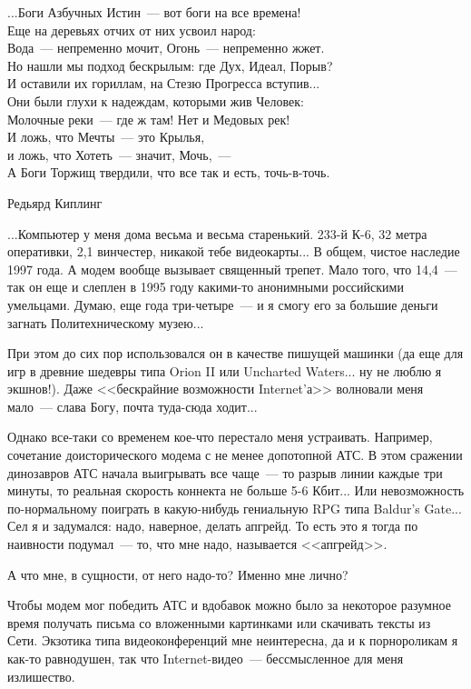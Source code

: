 \documentclass{scrbook}
\makeatletter
\newcommand{\bigepigraphwidth}{0.8} %
\newcommand{\defaultepigraphwidth}{0.5} %
\newcommand{\flqq}{<<}
\newcommand{\frqq}{>>}
\newcommand{\mdash}{~--- }
\newcommand{\commamdash}{~--- } %
\newcommand{\myepigraph}[3][\@empty]{
	\ifx\@empty#1
		\setlength{\epigraphwidth}{\defaultepigraphwidth\textwidth}
	\else
		\setlength{\epigraphwidth}{#1\textwidth}
	\fi
	\epigraph{#2}{#3}
	\setlength{\epigraphwidth}{\defaultepigraphwidth\textwidth} %
	\nopagebreak
}
\makeatother
\begin{document}
\myepigraph[\bigepigraphwidth]{...Боги Азбучных Истин{\mdash}вот боги на все времена! \\
Еще на деревьях отчих от них усвоил народ: \\
Вода{\mdash}непременно мочит, Огонь{\mdash}непременно жжет. \\
Но нашли мы подход бескрылым: где Дух, Идеал, Порыв? \\
И оставили их гориллам, на Стезю Прогресса вступив... \\
Они были глухи к надеждам, которыми жив Человек: \\
Молочные реки{\mdash}где ж там! Нет и Медовых рек! \\
И ложь, что Мечты{\mdash}это Крылья, \\
и ложь, что Хотеть{\mdash}значит, Мочь,{\commamdash}\\
А Боги Торжищ твердили, что все так и есть, точь-в-точь.}
{Редьярд Киплинг}

...Компьютер у меня дома весьма и весьма старенький. 233-й К-6, 32 метра оперативки, 2,1 винчестер, никакой тебе видеокарты... В общем, чистое наследие 1997 года. А модем вообще вызывает священный трепет. Мало того, что 14,4{\mdash}так он еще и слеплен в 1995 году какими-то анонимными российскими умельцами. Думаю, еще года три-четыре{\mdash}и я смогу его за большие деньги загнать Политехническому музею...

При этом до сих пор использовался он в качестве пишущей машинки (да еще для игр в древние шедевры типа Orion II или Uncharted Waters... ну не люблю я экшнов!). Даже {\flqq}бескрайние возможности Internet'а{\frqq} волновали меня мало{\mdash}слава Богу, почта туда-сюда ходит...

Однако все-таки со временем кое-что перестало меня устраивать. Например, сочетание доисторического модема с не менее допотопной АТС. В этом сражении динозавров АТС начала выигрывать все чаще{\mdash}то разрыв линии каждые три минуты, то реальная скорость коннекта не больше 5-6 Кбит... Или невозможность по-нормальному поиграть в какую-нибудь гениальную RPG типа Baldur's Gate... Сел я и задумался: надо, наверное, делать апгрейд. То есть это я тогда по наивности подумал{\mdash}то, что мне надо, называется {\flqq}апгрейд{\frqq}.

А что мне, в сущности, от него надо-то? Именно мне лично?

Чтобы модем мог победить АТС и вдобавок можно было за некоторое разумное время получать письма со вложенными картинками или скачивать тексты из Сети. Экзотика типа видеоконференций мне неинтересна, да и к порнороликам я как-то равнодушен, так что Internet-видео{\mdash}бессмысленное для меня излишество.
\end{document}
